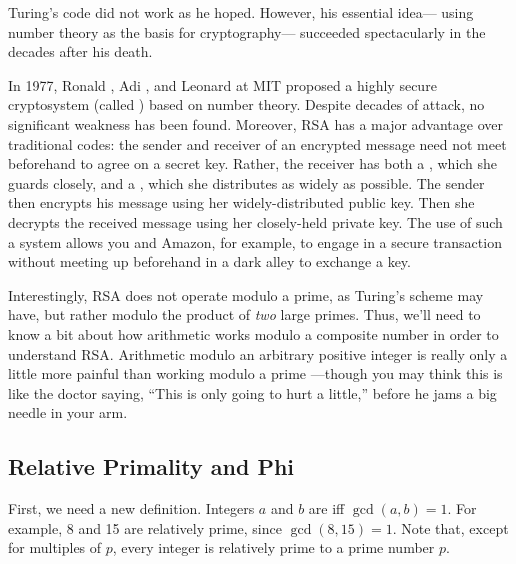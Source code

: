 \label{arithmetic_modn_sec}

Turing's code did not work as he hoped.  However, his essential
idea--- using number theory as the basis for cryptography--- succeeded
spectacularly in the decades after his death.

In 1977, Ronald , Adi , and
Leonard  at MIT proposed a highly secure cryptosystem
(called \textbf{}) based on number theory.  Despite decades
of attack, no significant weakness has been found.  Moreover, RSA has
a major advantage over traditional codes: the sender and receiver of
an encrypted message need not meet beforehand to agree on a secret
key.  Rather, the receiver has both a , which she
guards closely, and a , which she distributes as
widely as possible.  The sender then encrypts his message using her
widely-distributed public key.  Then she decrypts the received message
using her closely-held private key.  The use of such a  system allows you and Amazon, for example, to engage
in a secure transaction without meeting up beforehand in a dark alley
to exchange a key.

Interestingly, RSA does not operate modulo a prime, as Turing's scheme
may have, but rather modulo the product of \emph{two} large primes.
Thus, we'll need to know a bit about how arithmetic works modulo a
composite number in order to understand RSA.  Arithmetic modulo an
arbitrary positive integer is really only a little more painful than
working modulo a prime ---though you may think this is like
the doctor saying, ``This is only going to hurt a little,'' before he
jams a big needle in your arm.

\subsection{Relative Primality and Phi}

First, we need a new definition.  Integers $a$ and $b$ are
 iff $\gcd(a, b) = 1$.  For example, 8 and 15
are relatively prime, since $\gcd(8, 15) = 1$.  Note that, except for
multiples of $p$, every integer is relatively prime to a prime number
$p$.

